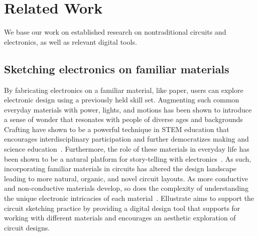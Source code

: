 \documentclass{sigchi}
\begin{document}
\section{Related Work}
We base our work on established research on nontraditional circuits and electronics, as well as relevant digital tools. 

\subsection{Sketching electronics on familiar materials}
By fabricating electronics on a familiar material, like paper, users can explore electronic design using a previously held skill set.  Augmenting such common everyday materials with power, lights, and motions has been shown to introduce a sense of wonder that resonates with people of diverse ages and backgrounds~\cite{karagozler_paper_2013,Qi:2010tp,qi_stickers_2015,qi_sketching_2014} Crafting have shown to be a powerful technique in STEM education that encourages interdisciplinary participation and further democratizes making and science education~\cite{qi_sketching_2014}.
Furthermore, the role of these materials in everyday life has been shown to be a natural platform for story-telling with electronics~\cite{Jacoby:2013cq}. As such, incorporating familiar materials in circuits has altered the design landscape leading to more natural, organic, and novel circuit layouts.
As more conductive and non-conductive materials develop, so does the complexity of understanding the unique electronic intricacies of each material~\cite{Hodges:2014cm}.  Ellustrate aims to support the circuit sketching practice by providing a digital design tool that supports for working with different materials and encourages an aesthetic exploration of circuit designs.

\end{document}
